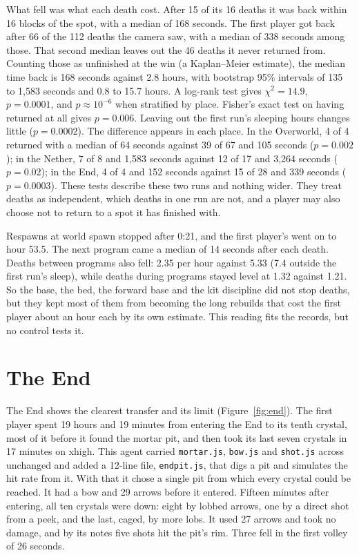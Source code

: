 \documentclass[11pt,a4paper]{article}
\begin{document}
What fell was what each death cost. After 15 of its 16 deaths it was back within 16 blocks of the spot, with a median of 168 seconds. The first player got back after 66 of the 112 deaths the camera saw, with a median of 338 seconds among those. That second median leaves out the 46 deaths it never returned from. Counting those as unfinished at the win (a Kaplan--Meier estimate), the median time back is 168 seconds against 2.8 hours, with bootstrap 95\% intervals of 135 to 1,583 seconds and 0.8 to 15.7 hours. A log-rank test gives $\chi^2 = 14.9$, $p = 0.0001$, and $p \approx 10^{-6}$ when stratified by place. Fisher's exact test on having returned at all gives $p = 0.006$. Leaving out the first run's sleeping hours changes little ($p = 0.0002$). The difference appears in each place. In the Overworld, 4 of 4 returned with a median of 64 seconds against 39 of 67 and 105 seconds ($p = 0.002$); in the Nether, 7 of 8 and 1,583 seconds against 12 of 17 and 3,264 seconds ($p = 0.02$); in the End, 4 of 4 and 152 seconds against 15 of 28 and 339 seconds ($p = 0.0003$). These tests describe these two runs and nothing wider. They treat deaths as independent, which deaths in one run are not, and a player may also choose not to return to a spot it has finished with.

Respawns at world spawn stopped after 0:21, and the first player's went on to hour 53.5. The next program came a median of 14 seconds after each death. Deaths between programs also fell: 2.35 per hour against 5.33 (7.4 outside the first run's sleep), while deaths during programs stayed level at 1.32 against 1.21. So the base, the bed, the forward base and the kit discipline did not stop deaths, but they kept most of them from becoming the long rebuilds that cost the first player about an hour each by its own estimate. This reading fits the records, but no control tests it.

\section{The End}
\label{sec:end}

The End shows the clearest transfer and its limit (Figure~\ref{fig:end}). The first player spent 19 hours and 19 minutes from entering the End to its tenth crystal, most of it before it found the mortar pit, and then took its last seven crystals in 17 minutes on xhigh. This agent carried \texttt{mortar.js}, \texttt{bow.js} and \texttt{shot.js} across unchanged and added a 12-line file, \texttt{endpit.js}, that digs a pit and simulates the hit rate from it. With that it chose a single pit from which every crystal could be reached. It had a bow and 29 arrows before it entered. Fifteen minutes after entering, all ten crystals were down: eight by lobbed arrows, one by a direct shot from a peek, and the last, caged, by more lobs. It used 27 arrows and took no damage, and by its notes five shots hit the pit's rim. Three fell in the first volley of 26 seconds.
\end{document}
